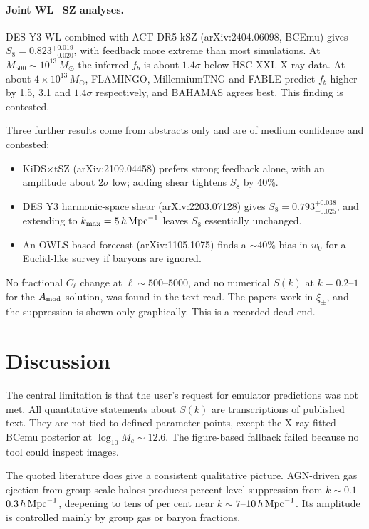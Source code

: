\documentclass[11pt,a4paper]{article}
\begin{document}
\paragraph{Joint WL+SZ analyses.} DES Y3 WL combined with ACT DR5 kSZ (arXiv:2404.06098, BCEmu) gives $S_8=0.823^{+0.019}_{-0.020}$, with feedback more extreme than most simulations. At $M_{500}\sim10^{13}\,M_\odot$ the inferred $f_b$ is about $1.4\sigma$ below HSC-XXL X-ray data. At about $4\times10^{13}\,M_\odot$, FLAMINGO, MillenniumTNG and FABLE predict $f_b$ higher by 1.5, 3.1 and $1.4\sigma$ respectively, and BAHAMAS agrees best. This finding is contested.

Three further results come from abstracts only and are of medium confidence and contested:
\begin{itemize}
\item KiDS$\times$tSZ (arXiv:2109.04458) prefers strong feedback alone, with an amplitude about $2\sigma$ low; adding shear tightens $S_8$ by 40\%.
\item DES Y3 harmonic-space shear (arXiv:2203.07128) gives $S_8=0.793^{+0.038}_{-0.025}$, and extending to $k_{\max}=5\,h\,{\rm Mpc}^{-1}$ leaves $S_8$ essentially unchanged.
\item An OWLS-based forecast (arXiv:1105.1075) finds a $\sim40\%$ bias in $w_0$ for a Euclid-like survey if baryons are ignored.
\end{itemize}

No fractional $C_\ell$ change at $\ell\sim500$--$5000$, and no numerical $S(k)$ at $k=0.2$--$1$ for the $A_{\rm mod}$ solution, was found in the text read. The papers work in $\xi_\pm$, and the suppression is shown only graphically. This is a recorded dead end.

\section{Discussion}
The central limitation is that the user's request for emulator predictions was not met. All quantitative statements about $S(k)$ are transcriptions of published text. They are not tied to defined parameter points, except the X-ray-fitted BCemu posterior at $\log_{10}M_c\sim12.6$. The figure-based fallback failed because no tool could inspect images.

The quoted literature does give a consistent qualitative picture. AGN-driven gas ejection from group-scale haloes produces percent-level suppression from $k\sim0.1$--$0.3\,h\,{\rm Mpc}^{-1}$, deepening to tens of per cent near $k\sim7$--$10\,h\,{\rm Mpc}^{-1}$. Its amplitude is controlled mainly by group gas or baryon fractions.
\end{document}
